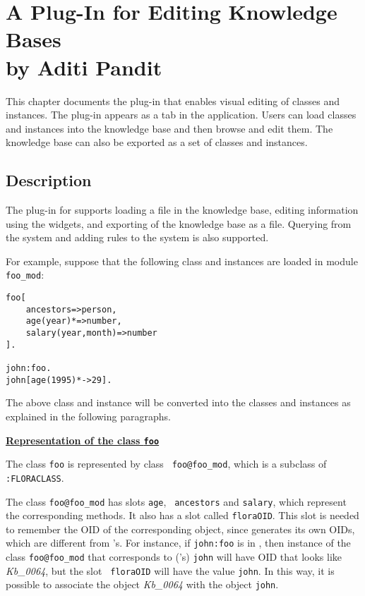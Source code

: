 

\chapter[A \Protege Plug-In for Editing  \FLORA Knowledge Bases]{A \Protege Plug-In for Editing  \FLORA Knowledge Bases\\
      {by Aditi Pandit}}

    This chapter documents the \Protege plug-in that enables visual editing of
    \FLORA classes and instances. The plug-in appears as a tab in the \Protege
    application. Users can load \FLORA classes and
    instances into the \Protege knowledge base and then browse and edit them.
    The \Protege knowledge base can also be exported as a set of
    \fl classes and instances.

\section{Description}

The \Protege plug-in for \FLORA supports loading a \FLORA file in
the \Protege knowledge base, editing information using the \Protege
widgets, and exporting of the \Protege knowledge base as a \FLORA
file. Querying from the \Protege system and adding rules to the
\FLORA system is also supported.

For example, suppose that the following \FLORA class and instances
are loaded in module {\tt foo\_mod}:

\begin{verbatim}
foo[
    ancestors=>person,
    age(year)*=>number,
    salary(year,month)=>number
].

john:foo.
john[age(1995)*->29].
\end{verbatim}

The above \FLORA class and instance will be converted into the
\Protege classes and instances as explained in the following
paragraphs.

\underline{{\bf Representation of the class {\tt foo}}}

 The \fl class {\tt foo} is represented by \Protege class {\tt
foo@foo\_mod}, which is a subclass of {\tt :FLORACLASS}.

The \Protege class {\tt foo@foo\_mod} has slots {\tt age}, {\tt
  ancestors} and {\tt salary}, which represent the corresponding \fl
methods. It also has a slot called {\tt floraOID}. This slot is
needed to remember the OID of the corresponding \FLORA object, since
\Protege generates its own OIDs, which are different from \FLORA's.
For instance, if {\tt john:foo} is in \FLORA, then \Protege instance
of the \Protege class {\tt foo@foo\_mod} that corresponds to
(\FLORA's) {\tt john} will have \Protege OID that looks like
\emph{Kb\_0064}, but the slot {\tt
  floraOID} will have the value {\tt john}. In this way, it is possible
to associate the \Protege object \emph{Kb\_0064} with the \FLORA object
{\tt john}.

